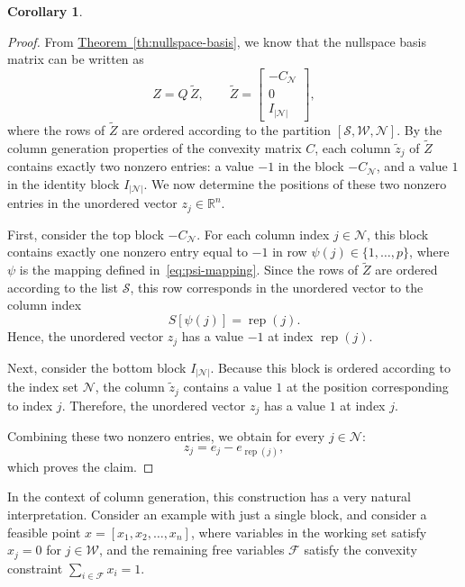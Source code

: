 \documentclass{book}
\theoremstyle{definition}
\newtheorem{cor}[theorem]{Corollary}
\newcommand{\thref}[1]{\hyperref[#1]{Theorem~\ref*{#1}}}
\numberwithin{algorithm_}{chapter}
\begin{document}
{\begin{cor}
\begin{proof}

From \thref{th:nullspace-basis}, we know that the nullspace basis matrix can be written as
\[
Z
=
Q \, \tilde{Z},
\qquad
\tilde{Z}
=
\begin{bmatrix}
- C_{\mathcal{N}} \\
0 \\
I_{|\mathcal{N}|}
\end{bmatrix},
\]
where the rows of \(\tilde{Z}\) are ordered according to the partition
\(
[\mathcal{S}, \mathcal{W}, \mathcal{N}]
\).
By the column generation properties of the convexity matrix \(C\), each column \(\tilde{z}_j\) of \(\tilde{Z}\) contains exactly two nonzero entries:  
a value \(-1\) in the block \(-C_{\mathcal{N}}\), and a value \(1\) in the identity block \(I_{|\mathcal{N}|}\).
We now determine the positions of these two nonzero entries in the unordered vector \(z_j \in \mathbb{R}^n\).

\bigskip

First, consider the top block \(-C_{\mathcal{N}}\).  
For each column index \(j \in \mathcal{N}\), this block contains exactly one nonzero entry equal to \(-1\) in row $\psi(j) \in \{1, \ldots, p\}$,
where \(\psi\) is the mapping defined in~\eqref{eq:psi-mapping}.  
Since the rows of \(\tilde{Z}\) are ordered according to the list \(\mathcal{S}\), this row corresponds in the unordered vector to the column index
\[
S[\psi(j)]
=
\operatorname{rep}(j).
\]
Hence, the unordered vector \(z_j\) has a value \(-1\) at index \(\operatorname{rep}(j)\).

\bigskip

Next, consider the bottom block \(I_{|\mathcal{N}|}\).  
Because this block is ordered according to the index set \(\mathcal{N}\), the column \(\tilde{z}_j\) contains a value \(1\) at the position corresponding to index \(j\).  
Therefore, the unordered vector \(z_j\) has a value \(1\) at index \(j\).

\bigskip

Combining these two nonzero entries, we obtain for every \(j \in \mathcal{N}\):
\[
z_j
=
e_j
-
e_{\operatorname{rep}(j)},
\]
which proves the claim.

\end{proof}
\end{cor}

\medskip

In the context of column generation, this construction has a very natural interpretation.  
Consider an example with just a single block, and consider a feasible point 
$x = [x_1, x_2, \dots, x_n]$,
where variables in the working set satisfy \(x_j = 0\) for \(j \in \mathcal{W}\), and the remaining free variables \(\mathcal{F}\) satisfy the convexity constraint \(\sum_{i \in \mathcal{F}} x_i = 1\).  

}
\end{document}
